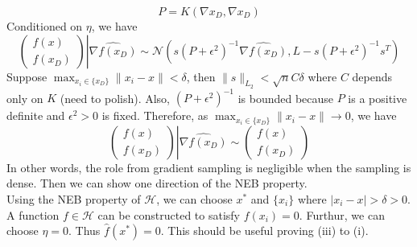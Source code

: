 \documentclass[a4paper,onecolumn]{article}
\begin{document}
\begin{equation*}
    P = K(\nabla x_D, \nabla x_D)
\end{equation*}
Conditioned on $\eta$, we have
\begin{equation*}
    \left.
    \begin{pmatrix}
        f(x)\\
        f(x_D)
    \end{pmatrix}
    \right| \widehat{\nabla f(x_D)}
    \sim
    \mathcal{N}
    \left(
        s(P+\epsilon^2)^{-1} \widehat{\nabla f(x_D)},
        L - s(P+\epsilon^2)^{-1} s^T
    \right)
\end{equation*}
Suppose $\max_{x_i\in\{x_D\}}\|x_i-x\| < \delta$, then
$
    \|s\|_{L_2} < \sqrt{n}C \delta
$
where $C$ depends only on $K$ (need to polish). Also, $(P+\epsilon^2)^{-1}$  is bounded because $P$ is a positive definite and
$\epsilon^2>0$ is fixed.
Therefore, as $\max_{x_i\in\{x_D\}}\|x_i-x\|\rightarrow 0$, we have
\begin{equation*}
    \left.
    \begin{pmatrix}
        f(x)\\
        f(x_D)
    \end{pmatrix}
    \right| \widehat{\nabla f(x_D)}
    \sim
    \begin{pmatrix}
        f(x)\\
        f(x_D)
    \end{pmatrix}
\end{equation*}
In other words, the role from gradient sampling is negligible when the sampling is dense. Then we can show one direction
of the NEB property.\\

\noindent Using the NEB property of $\mathcal{H}$, we can choose $x^*$ and $\{x_i\}$ where $|x_i-x|>\delta>0$.
A function $f\in \mathcal{H}$ can be constructed to satisfy
$f(x_i) = 0$. Furthur, we can choose $\eta=0$. Thus $\hat{f}(x^*) =0$. This should be useful proving (iii) to (i).\\
\end{document}

